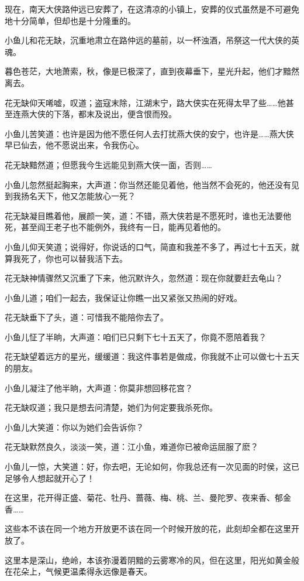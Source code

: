 \documentclass[12pt,oneside]{book}
\begin{document}
现在，南天大侠路仲远已安葬了，在这清凉的小镇上，安葬的仪式虽然是不可避免地十分简单，但却也是十分隆重的。

小鱼儿和花无缺，沉重地肃立在路仲远的墓前，以一杯浊酒，吊祭这一代大侠的英魂。

暮色苍茫，大地萧索，秋，像是已极深了，直到夜幕垂下，星光升起，他们才黯然离去。

花无缺仰天唏嘘，叹道；盗寇末除，江湖末宁，路大侠实在死得太早了些\ldots\ldots 他甚至连燕大侠的下落，都末及说出，便含恨而殁。

小鱼儿苦笑道：也许是因为他不愿任何人去打扰燕大侠的安宁，也许是\ldots\ldots 燕大侠早已仙去，他不愿说出来，令我伤心。

花无缺黯然道；但愿我今生远能见到燕大侠一面，否则\ldots\ldots{}

小鱼儿忽然挺起胸来，大声道：你当然还能见着他，他当然不会死的，他还没有见到我扬名天下，他又怎能放心一死？

花无缺凝目瞧着他，展颜一笑，道：不错，燕大侠若是不愿死时，谁也无法要他死，甚至阎王老子也不能例外，我终有一日，能再见着他的。

小鱼儿仰天笑道；说得好，你说话的口气，简直和我差不多了，再过七十五天，就算我死了，你也可以替我活下去。

花无缺神情骤然又沉重了下来，他沉默许久，忽然道：现在你就要赶去龟山？

小鱼儿道；咱们一起去，我保证让你瞧一出又紧张又热闹的好戏。

花无缺垂下了头，道：可惜我不能陪你去了。

小鱼儿怔了半晌，大声道：咱们已只剩下七十五天了，你竟不愿陪着我？

花无缺望着远方的星光，缓缓道：我这件事若是做成，你我就不止可以做七十五天的朋友。

小鱼儿凝注了他半晌，大声道：你莫非想回移花宫？

花无缺叹道；我只是想去问清楚，她们为何定要我杀死你。

小鱼儿大笑道：你以为她们会告诉你？

花无缺默然良久，淡淡一笑，道：江小鱼，难道你已被命运屈服了麽？

小鱼儿一惊，大笑道：好，你去吧，无论如何，你我总还有一次见面的时侯，这已足够令人想起就开心了！

在这里，花开得正盛、菊花、牡丹、蔷薇、梅、桃、兰、曼陀罗、夜来香、郁金香\ldots\ldots{}

这些本不该在同一个地方开放更不该在同一个时候开放的花，此刻却全都在这里开放了。

这里本是深山，绝岭，本该弥漫着阴黯的云雾寒冷的风，但在这里，阳光如黄金般在花朵上，气候更温柔得永远像是春天。
\end{document}
